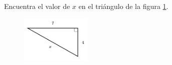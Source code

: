 \question[15]  Encuentra el valor de $x$ en el triángulo de la figura \ref{fig:lados_pitagoras_20}.
\begin{figure}[H]
    \begin{center}
        \includegraphics[width=0.3\textwidth]{../images/lados_pitagoras_20.png}
    \end{center}
    \caption{}
    \label{fig:lados_pitagoras_20}
\end{figure}